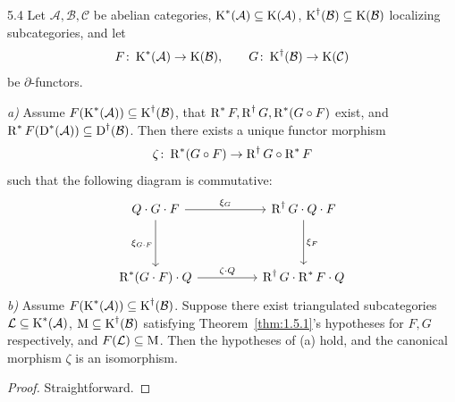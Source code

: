 \begin{bookproposition}{5.4}\label{prop:1.5.4}
Let $\mathcal{A},\mathcal{B},\mathcal{C}$ be abelian categories, $\operatorname{K}^*(\mathcal{A})\subseteq\operatorname{K}(\mathcal{A})$, $\operatorname{K}^\dagger(\mathcal{B})\subseteq\operatorname{K}(\mathcal{B})$ localizing subcategories, and let
\[
F\colon\operatorname{K}^*(\mathcal{A})\to\operatorname{K}(\mathcal{B}),\qquad
G\colon\operatorname{K}^\dagger(\mathcal{B})\to\operatorname{K}(\mathcal{C})
\]
be $\partial$-functors.

\emph{a)} Assume $F(\operatorname{K}^*(\mathcal{A}))\subseteq\operatorname{K}^\dagger(\mathcal{B})$, that $\operatorname{R}^*F,\operatorname{R}^\dagger G,\operatorname{R}^*(G\circ F)$ exist, and $\operatorname{R}^*F(\operatorname{D}^*(\mathcal{A}))\subseteq\operatorname{D}^\dagger(\mathcal{B})$. Then there exists a unique functor morphism
\[
\zeta\colon \operatorname{R}^*(G\circ F) \to \operatorname{R}^\dagger G\circ \operatorname{R}^*F
\]
such that the following diagram is commutative:
\[
\begin{tikzcd}
	Q \cdot G \cdot F \arrow[rr, "\xi_G"] \arrow[dd, "\xi_{G \cdot F}"'] & & \RR^\dagger G \cdot Q \cdot F \arrow[dd, "\xi_F"] \\
	\\
	\RR^*(G \cdot F) \cdot Q \arrow[rr, "\zeta \cdot Q"] & & \RR^\dagger G \cdot \RR^* F \cdot Q
\end{tikzcd}
\]
\emph{b)} Assume $F(\operatorname{K}^*(\mathcal{A}))\subseteq\operatorname{K}^\dagger(\mathcal{B})$. Suppose there exist triangulated subcategories $\mathcal{L}\subseteq\operatorname{K}^*(\mathcal{A})$, $\operatorname{M}\subseteq\operatorname{K}^\dagger(\mathcal{B})$ satisfying Theorem~\ref{thm:1.5.1}'s hypotheses for $F,G$ respectively, and $F(\mathcal{L})\subseteq\operatorname{M}$. Then the hypotheses of (a) hold, and the canonical morphism $\zeta$ is an isomorphism.
\end{bookproposition}

\begin{proof}
Straightforward.
\end{proof}


